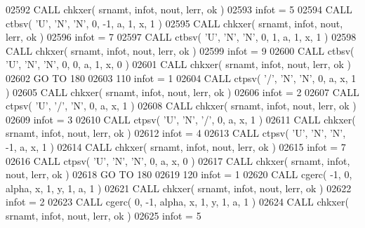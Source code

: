 \begin{DoxyCode}
02592       \textcolor{keyword}{CALL }chkxer( srnamt, infot, nout, lerr, ok )
02593       infot = 5
02594       \textcolor{keyword}{CALL }ctbsv( \textcolor{stringliteral}{'U'}, \textcolor{stringliteral}{'N'}, \textcolor{stringliteral}{'N'}, 0, -1, a, 1, x, 1 )
02595       \textcolor{keyword}{CALL }chkxer( srnamt, infot, nout, lerr, ok )
02596       infot = 7
02597       \textcolor{keyword}{CALL }ctbsv( \textcolor{stringliteral}{'U'}, \textcolor{stringliteral}{'N'}, \textcolor{stringliteral}{'N'}, 0, 1, a, 1, x, 1 )
02598       \textcolor{keyword}{CALL }chkxer( srnamt, infot, nout, lerr, ok )
02599       infot = 9
02600       \textcolor{keyword}{CALL }ctbsv( \textcolor{stringliteral}{'U'}, \textcolor{stringliteral}{'N'}, \textcolor{stringliteral}{'N'}, 0, 0, a, 1, x, 0 )
02601       \textcolor{keyword}{CALL }chkxer( srnamt, infot, nout, lerr, ok )
02602       \textcolor{keywordflow}{GO TO} 180
02603   110 infot = 1
02604       \textcolor{keyword}{CALL }ctpsv( \textcolor{stringliteral}{'/'}, \textcolor{stringliteral}{'N'}, \textcolor{stringliteral}{'N'}, 0, a, x, 1 )
02605       \textcolor{keyword}{CALL }chkxer( srnamt, infot, nout, lerr, ok )
02606       infot = 2
02607       \textcolor{keyword}{CALL }ctpsv( \textcolor{stringliteral}{'U'}, \textcolor{stringliteral}{'/'}, \textcolor{stringliteral}{'N'}, 0, a, x, 1 )
02608       \textcolor{keyword}{CALL }chkxer( srnamt, infot, nout, lerr, ok )
02609       infot = 3
02610       \textcolor{keyword}{CALL }ctpsv( \textcolor{stringliteral}{'U'}, \textcolor{stringliteral}{'N'}, \textcolor{stringliteral}{'/'}, 0, a, x, 1 )
02611       \textcolor{keyword}{CALL }chkxer( srnamt, infot, nout, lerr, ok )
02612       infot = 4
02613       \textcolor{keyword}{CALL }ctpsv( \textcolor{stringliteral}{'U'}, \textcolor{stringliteral}{'N'}, \textcolor{stringliteral}{'N'}, -1, a, x, 1 )
02614       \textcolor{keyword}{CALL }chkxer( srnamt, infot, nout, lerr, ok )
02615       infot = 7
02616       \textcolor{keyword}{CALL }ctpsv( \textcolor{stringliteral}{'U'}, \textcolor{stringliteral}{'N'}, \textcolor{stringliteral}{'N'}, 0, a, x, 0 )
02617       \textcolor{keyword}{CALL }chkxer( srnamt, infot, nout, lerr, ok )
02618       \textcolor{keywordflow}{GO TO} 180
02619   120 infot = 1
02620       \textcolor{keyword}{CALL }cgerc( -1, 0, alpha, x, 1, y, 1, a, 1 )
02621       \textcolor{keyword}{CALL }chkxer( srnamt, infot, nout, lerr, ok )
02622       infot = 2
02623       \textcolor{keyword}{CALL }cgerc( 0, -1, alpha, x, 1, y, 1, a, 1 )
02624       \textcolor{keyword}{CALL }chkxer( srnamt, infot, nout, lerr, ok )
02625       infot = 5

\end{DoxyCode}
